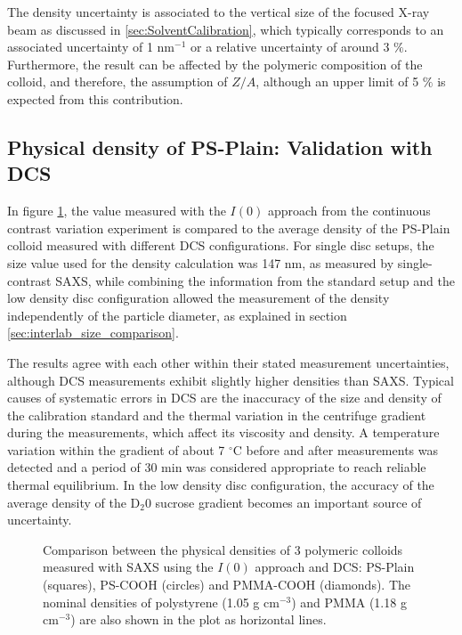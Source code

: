 The density uncertainty is associated to the vertical size of the focused X-ray beam as discussed in \ref{sec:SolventCalibration}, which typically corresponds to an associated uncertainty of 1 nm$^{-1}$ or a relative uncertainty of around 3 $\%$. Furthermore, the result can be affected by the polymeric composition of the colloid, and therefore, the assumption of $Z/A$, although an upper limit of 5 $\%$ is expected from this contribution.

\subsection{Physical density of PS-Plain: Validation with DCS}

In figure \ref{fig:DensityComparison}, the value measured with the $I(0)$ approach from the continuous contrast variation experiment is compared to the average density of the PS-Plain colloid measured with different DCS configurations. For single disc setups, the size value used for the density calculation was 147 nm, as measured by single-contrast SAXS, while combining the information from the standard setup and the low density disc configuration allowed the measurement of the density independently of the particle diameter, as explained in section \ref{sec:interlab_size_comparison}.

The results agree with each other within their stated measurement uncertainties, although DCS measurements exhibit slightly higher densities than SAXS. Typical causes of systematic errors in DCS are the inaccuracy of the size and density of the calibration standard and the thermal variation in the centrifuge gradient during the measurements, which affect its viscosity and density\citep{kamiti_simultaneous_2012}. A temperature variation within the gradient of about 7 $^{\circ}$C before and after measurements was detected and a period of 30 min was considered appropriate to reach reliable thermal equilibrium. In the low density disc configuration, the accuracy of the average density of the D$_2$0 sucrose gradient becomes an important source of uncertainty.
\begin{figure}
	\begin{center}
		
	\end{center}
	\caption[Physical densities of 3 polymeric colloids measured with SAXS and DCS.]{Comparison between the physical densities of 3 polymeric colloids measured with SAXS using the $I(0)$ approach and DCS: PS-Plain (squares), PS-COOH (circles) and PMMA-COOH (diamonds). The nominal densities of polystyrene (1.05 g cm$^{-3}$) and PMMA (1.18 g cm$^{-3}$) are also shown in the plot as horizontal lines\citep{dingenouts_analysis_1999}.}
	\label{fig:DensityComparison}
\end{figure}

